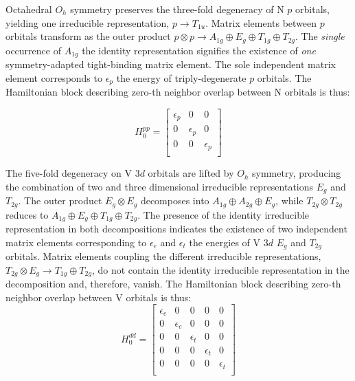 \documentclass[twocolumn,showpacs,preprintnumbers,superscriptaddress,prb,floatfix,aps,10pt]{revtex4-1}
\begin{document}
Octahedral $O_h$ symmetry preserves the three-fold degeneracy of N $p$ orbitals, yielding one irreducible representation, $p \rightarrow T_{1u}$. Matrix elements between $p$ orbitals transform as the outer product  $p \otimes p \rightarrow A_{1g} \oplus E_g \oplus T_{1g} \oplus T_{2g}$. The \emph{single} occurrence of $A_{1g}$ the identity representation signifies the existence of \emph{one} symmetry-adapted tight-binding matrix element. The sole independent matrix element corresponds to $\epsilon_p$ the energy of triply-degenerate $p$ orbitals. The Hamiltonian block describing zero-th neighbor overlap between N orbitals is thus:

\begin{equation}
H_0^{pp} =
\begin{bmatrix}
\epsilon_{p} & 0 & 0 \\
0 & \epsilon_{p} & 0 \\
0 & 0 & \epsilon_{p} \\
\end{bmatrix}
\end{equation}

The five-fold degeneracy on V 3$d$ orbitals are lifted by $O_h$ symmetry, producing the combination of two and three dimensional irreducible representations $E_g$ and $T_{2g}$. The outer product $E_g \otimes E_g$ decomposes into $A_{1g} \oplus A_{2g} \oplus E_g$, while $T_{2g} \otimes T_{2g}$ reduces to $ A_{1g} \oplus E_{g} \oplus T_{1g} \oplus T_{2g}$. The presence of the identity irreducible representation in both decompositions indicates the existence of two independent matrix elements corresponding to $\epsilon_e$ and $\epsilon_t$ the energies of V 3$d$ $E_g$ and $T_{2g}$ orbitals. Matrix elements coupling the different irreducible representations, $T_{2g} \otimes E_g \rightarrow T_{1g} \oplus T_{2g}$, do not contain the identity irreducible representation in the decomposition and, therefore, vanish. The Hamiltonian block describing zero-th neighbor overlap between V orbitals is thus:
\begin{equation}
H_0^{dd} =
\begin{bmatrix}
 \epsilon_{e} & 0 & 0 & 0 & 0 \\
 0 & \epsilon_{e} & 0 & 0 & 0 \\
 0 & 0 & \epsilon_{t} & 0 & 0 \\
 0 & 0 & 0 & \epsilon_{t} & 0 \\
 0 & 0 & 0 & 0 & \epsilon_{t} \\
\end{bmatrix}
\end{equation}
\end{document}
